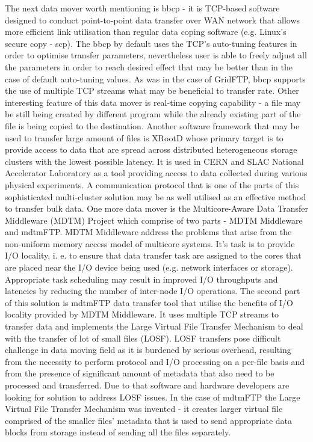 \documentclass[magisterska,en]{pracamgr}
\begin{document}
The next data mover worth mentioning is bbcp - it is TCP-based software designed to conduct point-to-point data transfer over WAN network that allows more efficient link utilisation than regular data coping software (e.g. Linux's secure copy - scp). The bbcp by default uses the TCP's auto-tuning features in order to optimise transfer parameters, nevertheless user is able to freely adjust all the parameters in order to reach desired effect that may be better than in the case of default auto-tuning values. As was in the case of GridFTP, bbcp supports the use of multiple TCP streams what may be beneficial to transfer rate. Other interesting feature of this data mover is real-time copying capability - a file may be still being created by different program while the already existing part of the file is being copied to the destination. \cite{bbcp_homepage}
Another software framework that may be used to transfer large amount of files is XRootD whose primary target is to provide access to data that are spread across distributed heterogeneous storage clusters with the lowest possible latency. It is used in CERN and SLAC National Accelerator Laboratory as a tool providing access to data collected during various physical experiments. A communication protocol that is one of the parts of this sophisticated multi-cluster solution may be as well utilised as an effective method to transfer bulk data. \cite{xrootd_homepage, xrootd_paper1, xrootd_paper2}
One more data mover is the Multicore-Aware Data Transfer Middleware (MDTM) Project which comprise of two parts - MDTM Middleware and mdtmFTP. MDTM Middleware address the problems that arise from the non-uniform memory access model of multicore systems. It's task is to provide I/O locality, i. e. to ensure that data transfer task are assigned to the cores that are placed near the I/O device being used (e.g. network interfaces or storage). Appropriate task scheduling may result in improved I/O throughputs and latencies by reducing the number of inter-node I/O operations. The second part of this solution is mdtmFTP data transfer tool that utilise the benefits of I/O locality provided by MDTM Middleware. It uses multiple TCP streams to transfer data and implements the Large Virtual File Transfer Mechanism to deal with the transfer of lot of small files (LOSF). LOSF transfers pose difficult challenge in data moving field as it is burdened by serious overhead, resulting from the necessity to perform protocol and I/O processing on a per-file basis and from the presence of significant amount of metadata that also need to be processed and transferred. Due to that software and hardware developers are looking for solution to address LOSF issues. In the case of mdtmFTP the Large Virtual File Transfer Mechanism was invented - it creates larger virtual file comprised of the smaller files' metadata that is used to send appropriate data blocks from storage instead of sending all the files separately. \cite{MDTM_homepage}
\end{document}
